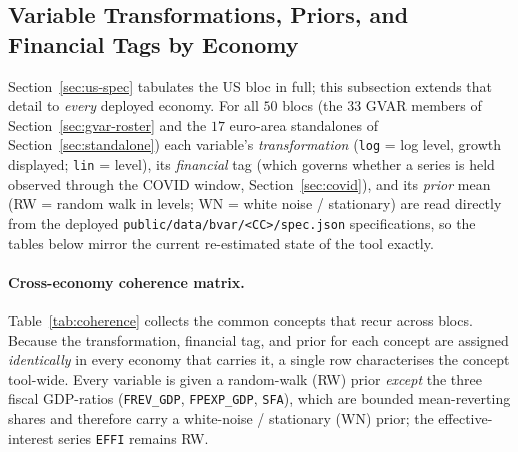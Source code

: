 \documentclass[11pt]{article}
\theoremstyle{definition}
\theoremstyle{remark}
\begin{document}
\subsection{Variable Transformations, Priors, and Financial Tags by Economy}\label{sec:varcoherence}

Section~\ref{sec:us-spec} tabulates the US bloc in full; this subsection
extends that detail to \emph{every} deployed economy. For all $50$ blocs
(the $33$ GVAR members of Section~\ref{sec:gvar-roster} and the $17$
euro-area standalones of Section~\ref{sec:standalone}) each variable's
\emph{transformation} (\texttt{log} = log level, growth displayed;
\texttt{lin} = level), its \emph{financial} tag (which governs whether a
series is held observed through the COVID window, Section~\ref{sec:covid}),
and its \emph{prior} mean (RW = random walk in levels; WN = white noise /
stationary) are read directly from the deployed
\texttt{public/data/bvar/<CC>/spec.json} specifications, so the tables below
mirror the current re-estimated state of the tool exactly.

\paragraph{Cross-economy coherence matrix.} Table~\ref{tab:coherence}
collects the common concepts that recur across blocs. Because the
transformation, financial tag, and prior for each concept are assigned
\emph{identically} in every economy that carries it, a single row
characterises the concept tool-wide. Every variable is given a
random-walk (RW) prior \emph{except} the three fiscal GDP-ratios
(\texttt{FREV\_GDP}, \texttt{FPEXP\_GDP}, \texttt{SFA}), which are bounded
mean-reverting shares and therefore carry a white-noise / stationary (WN)
prior; the effective-interest series \texttt{EFFI} remains RW.
\end{document}
